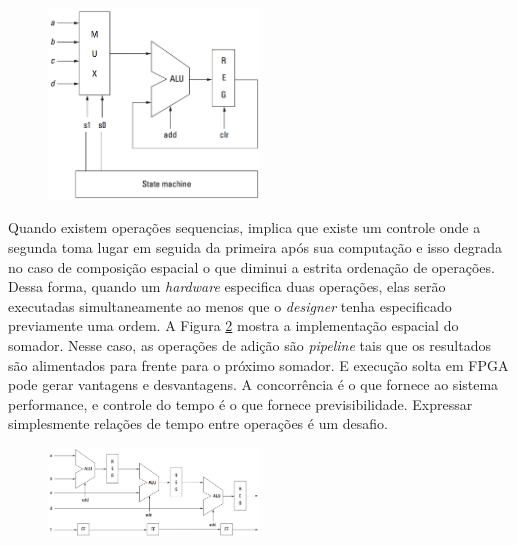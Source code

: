 \begin{figure}[H] \centering

	\includegraphics[width=0.5\textwidth]{img/f3-13.png}

	\caption{}

	\label{fig:f3-13}

\end{figure}



Quando existem operações sequencias, implica que existe um controle onde a segunda toma lugar em seguida da primeira após sua computação e isso degrada no caso de composição espacial o que diminui a estrita ordenação de operações. Dessa forma, quando um \textit{hardware} especifica duas operações, elas serão executadas simultaneamente ao menos que o \textit{\textit{design}er} tenha especificado previamente uma ordem. A Figura \ref{fig:f3-14} mostra a implementação espacial do somador. Nesse caso, as operações de adição são \textit{pipeline} tais que os resultados são alimentados para frente para o próximo somador. E execução solta em FPGA pode gerar vantagens e desvantagens. A concorrência é o que fornece ao sistema performance, e controle do tempo é o que fornece previsibilidade. Expressar simplesmente relações de tempo entre operações é um desafio.



\begin{figure}[H] \centering

	\includegraphics[width=0.5\textwidth]{img/f3-14.png}

	\caption{}

	\label{fig:f3-14}

\end{figure}



